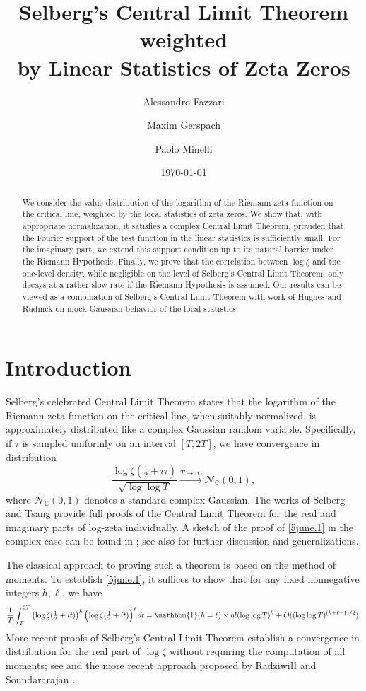 \documentclass[12pt,oneside,english,a4paper]{amsart}
\title[Selberg's Central Limit Theorem weighted by Linear Statistics of Zeta Zeros]{Selberg's Central Limit Theorem weighted \\ by Linear Statistics of Zeta Zeros}
\author{Alessandro Fazzari}
\author{Maxim Gerspach}
\author{Paolo Minelli}
\date{\today}
\theoremstyle{remark}
\numberwithin{equation}{section}
\begin{document}
\begin{abstract}
    We consider the value distribution of the logarithm of the Riemann zeta function on the critical line, weighted by the local statistics of zeta zeros. We show that, with appropriate normalization, it satisfies a complex Central Limit Theorem, provided that the Fourier support of the test function in the linear statistics is sufficiently small. 
    For the imaginary part, we extend this support condition up to its natural barrier under the Riemann Hypothesis. Finally, we prove that the correlation between $\log \zeta$ and the one-level density, while negligible on the level of Selberg's Central Limit Theorem, only decays at a rather slow rate if the Riemann Hypothesis is assumed. Our results can be viewed as a combination of Selberg's Central Limit Theorem with work of Hughes and Rudnick on mock-Gaussian behavior of the local statistics.
\end{abstract}

\maketitle

\section{Introduction}

Selberg's celebrated Central Limit Theorem states that the logarithm of the Riemann zeta function on the critical line, when suitably normalized, is approximately distributed like a complex Gaussian random variable. Specifically, if $\tau$ is sampled uniformly on an interval $[T,2T]$, we have convergence in distribution
\begin{equation}\label{5june.1}
    \frac{\log \zeta ( \tfrac12 + i \tau)}{\sqrt{\log \log T}} \overset{T \to \infty}{\longrightarrow} \mathcal{N}_{\mathbb{C}}(0,1),
\end{equation}
where $\mathcal{N}_{\mathbb{C}}(0,1)$ denotes 
a standard complex Gaussian. 
The works of Selberg \cite{Selberg, Selberg2} and Tsang \cite{Tsang1} provide full proofs of the Central Limit Theorem for the real and imaginary parts of log-zeta individually. A sketch of the proof of \eqref{5june.1} in the complex case can be found in \cite{Joyner}; see also \cite{Laurinchikas, BombieriHejhal} for further discussion and generalizations.

The classical approach to proving such a theorem is based on the method of moments. To establish \eqref{5june.1}, it suffices to show that for any fixed nonnegative integers $h,\ell$, we have
\begin{align*}
    \frac{1}{T} \int_T^{2T} \left(\log\zeta(\tfrac12+it)\right)^h  \left(\overline{\log\zeta(\tfrac12+it)}\right)^\ell dt
    =  \mathbbm{1}(h=\ell) \times h!(\log\log T)^h  + O((\log\log T)^{(h+\ell-1)/2}).
\end{align*}
More recent proofs of Selberg's Central Limit Theorem establish a convergence in distribution for the real part of $\log \zeta$ without requiring the computation of all moments; see \cite{BombieriHejhal,Laurinchikas2} and the more recent approach proposed by Radziwi{\l}{\l} and Soundararajan \cite{RadziwillSound}.
\end{document}
